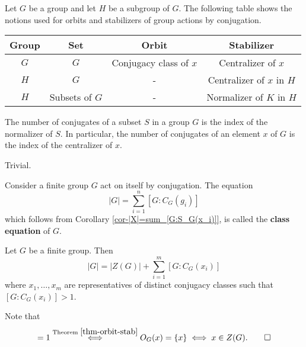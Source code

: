 \begin{definition} \label{def-notions-of-orbits-and-stab}
	Let $G$ be a group and let $H$ be a subgroup of $G$. The following table shows the notions used for orbits and stabilizers of  group actions by conjugation.
	\begin{center}
		\begin{tabular}{|c|c|c|c|}
			\hline
			Group & Set & Orbit & Stabilizer   \\
			\hline\hline
			$G$ & $G$ & Conjugacy class of $x$ & Centralizer of $x$ \\
			\hline
			$H$ & $G$ & - & Centralizer of $x$ in $H$ \\
			\hline
			$H$ & Subsets of $G$ & - & Normalizer of $K$ in $H$ \\
			\hline
		\end{tabular}
	\end{center}
\end{definition}
\begin{proposition}
	The number of conjugates of a subset $S$ in a group $G$ is the index of the
	normalizer of $S$. In particular, the number of conjugates of an element $x$
	of $G$ is the index of the centralizer of  $x$.
\end{proposition}
\begin{sketch}
	Trivial.
\end{sketch}
\begin{definition}
	Consider a finite group $G$ act on itself by conjugation. The equation
	\begin{equation*}
		|G| = \sum_{i=1}^n [G:C_G(g_i)]
	\end{equation*}
	which follows from Corollary \ref{cor-|X|=sum_[G:S_G(x_i)]}, is called the \textbf{class equation} of $G$.
\end{definition}
\begin{proposition}
	Let $G$ be a finite group. Then 
	\begin{equation*}
		|G| = |Z(G)| + \sum_{i=1}^m [G:C_G(x_i)]
	\end{equation*}
	where $x_1,\dots, x_m$ are representatives of distinct conjugacy classes such that $[G:C_G(x_i)]>1$.
\end{proposition}
\begin{sketch}
	Note that 
	\begin{equation*}
		[G:C_G(x)]=1\overset{\text{Theorem } \ref{thm-orbit-stab}}{\iff} O_G(x) = \{x\} \iff x\in Z(G). \qedhere
	\end{equation*}
\end{sketch}
